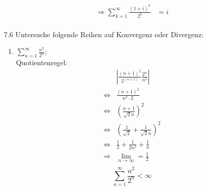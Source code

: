 \documentclass{HM}
\begin{document}
\begin{enumerate}
\begin{enumerate}
\begin{align*}
	\\
	\Rightarrow \sum\limits_{k=1}^\infty\frac{(1+i)^k}{2^k} &= i\\
\end{align*}
\end{enumerate}
\item[7.6] Untersuche folgende Reihen auf Konvergenz oder Divergenz:
\begin{enumerate}
\item $\sum\limits_{n=1}^\infty\frac{n^2}{2^n}$;\\
Quotientenregel:
\begin{align*}
	&\left|\frac{(n+1)^2}{2^(n+1)}\frac{2^n}{n^2}\right|\\
	\Leftrightarrow &\frac{(n+1)^2}{n^2\cdot 2}\\
	\Leftrightarrow &\left(\frac{n+1}{\sqrt{2}n}\right)^2\\
	\Leftrightarrow &\left(\frac{1}{\sqrt{2}}+\frac{1}{\sqrt{2}n}\right)^2\\
	\Leftrightarrow &\frac{1}{2} + \frac{1}{2n^2} + \frac{1}{n}\\
	\Rightarrow &\lim_{n\to\infty} = \frac{1}{2}\\
\end{align*}
$$\sum\limits_{n=1}^\infty\frac{n^2}{2^n} < \infty$$\\


\end{enumerate}
\end{enumerate}
\end{document}
